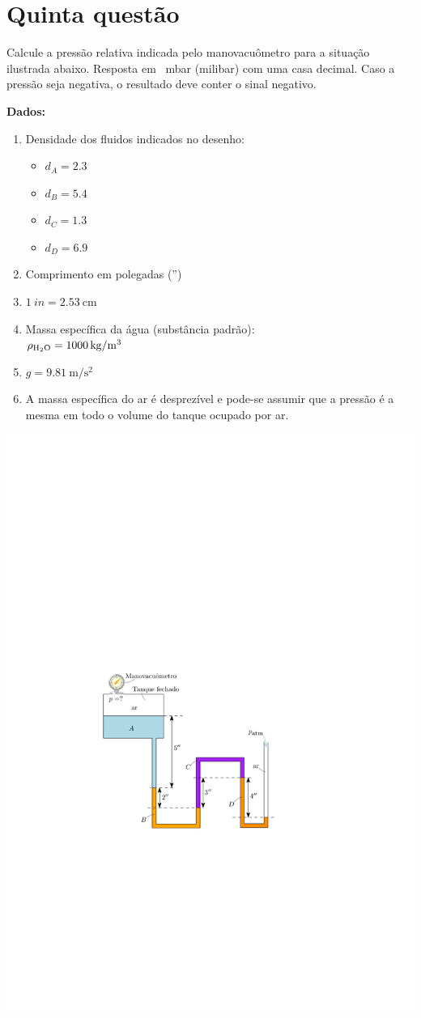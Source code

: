 \documentclass[
	a4paper,
	12pt,
	brazilian
]{article}
\begin{document}
	\section{Quinta questão}
	Calcule a pressão relativa indicada pelo manovacuômetro para a situação ilustrada abaixo. Resposta em \SI{}{\milli\bar} (milibar) com uma casa decimal. Caso a pressão seja negativa, o resultado deve conter o sinal negativo.\vspace{.5cm}
	
	\textbf{Dados:}
	\begin{enumerate}
		\item Densidade dos fluidos indicados no desenho:
		\begin{itemize}
			\item $d_{A}=2.3$
			\item $d_{B}=5.4$
			\item $d_{C}=1.3$
			\item $d_{D}=6.9$
		\end{itemize}
		\item Comprimento em polegadas ('')
		\item $\SI{1}{in}=\SI{2.53}{\centi\meter}$
		\item Massa específica da água (substância padrão):\\
		$\rho_{\ce{H2O}}=\SI{1000}{\kilogram/\meter^{3}}$
		\item $g=\SI{9.81}{\meter/\second^{2}}$
		\item A massa específica do ar é desprezível e pode-se assumir que a pressão é a mesma em todo o volume do tanque ocupado por ar.
	\end{enumerate}
	\begin{center}
		\includegraphics[width=.7\linewidth]{assets/images/ex5}
	\end{center}
\end{document}
